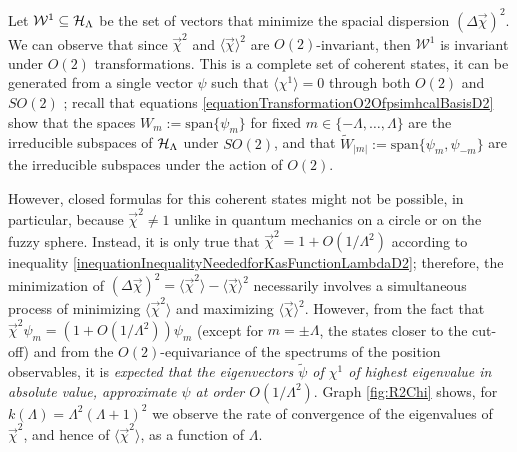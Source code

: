Let $\mathcal{W}^1 \subseteq \mathcal H_\Lambda$ be the set of vectors that minimize the spacial dispersion $(\Delta \vec \chi)^2$. We can observe that since $\vec \chi^2$ and $\langle \vec \chi \rangle^2$ are $O(2)$-invariant, then $\mathcal W^1$ is invariant under $O(2)$ transformations. This is a complete set of coherent states, it can be generated from a single vector $\psi$ such that $\langle \chi^1 \rangle = 0$ through both $O(2)$ and $SO(2)$ \cite{FioreCoherent2020}; recall that equations \eqref{equationTransformationO2OfpsimhcalBasisD2} show that the spaces $W_m := \text{span}\{\psi_m\}$ for fixed $m \in \{-\Lambda, \dots, \Lambda\}$ are the irreducible subspaces of $\mathcal H_\Lambda$ under $SO(2)$, and that $\tilde W_{|m|} := \text{span}\{\psi_m, \psi_{-m}\}$ are the irreducible subspaces under the action of $O(2)$.%

However, closed formulas for this coherent states might not be possible, in particular, because $\vec \chi^2 \neq 1$ unlike in quantum mechanics on a circle or on the fuzzy sphere. Instead, it is only true that $\vec \chi^2  = 1 + O(1/\Lambda^2)$ according to inequality \eqref{inequationInequalityNeededforKasFunctionLambdaD2}; therefore, the minimization of $ (\Delta \vec \chi)^2 = \langle \vec \chi^2 \rangle - \langle \vec \chi \rangle ^2$ necessarily involves a simultaneous process of minimizing $\langle \vec \chi^2 \rangle$ and maximizing $\langle \vec \chi\rangle ^2$. However, from the fact that $\vec \chi ^2 \psi_m  = (1 + O(1/\Lambda^2) )\psi_m$ (except for $m = \pm \Lambda$, the states closer to the cut-off) and from the $O(2)$-equivariance of the spectrums of the position observables, it is \textit{expected \cite{FioreCoherent2020} that the eigenvectors $\tilde \psi$ of $\chi^1$ of highest eigenvalue in absolute value, approximate $\psi$ at order $O(1/\Lambda^2)$}. Graph \ref{fig:R2Chi} shows, for $k(\Lambda) = \Lambda^2(\Lambda+1)^2$ we observe the rate of convergence of the eigenvalues of $\vec \chi^2$, and hence of $\langle \vec \chi^2\rangle$, as a function of $\Lambda$.%

